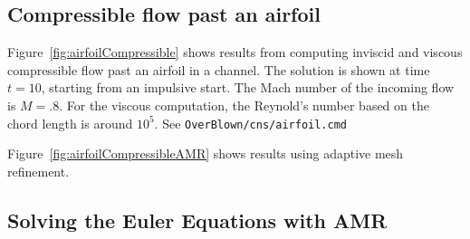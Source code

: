 \documentclass{article}
\newcommand{\obFigures}{\homeHenshaw/res/OverBlown/docFigures}  %
\begin{document}

% 
% 



\clearpage
\subsection{Compressible flow past an airfoil}


Figure~\ref{fig:airfoilCompressible} shows results from computing inviscid and viscous compressible 
flow past an airfoil in a channel. The solution is shown at time $t=10$,  starting
from an impulsive start. The Mach number of the incoming flow is $M=.8$. 
For the viscous computation, the Reynold's number based on the chord length
is around $10^5$. See {\tt OverBlown/\-cns/\-airfoil.cmd}

Figure~\ref{fig:airfoilCompressibleAMR} shows results using adaptive mesh refinement.





\clearpage
\subsection{Solving the Euler Equations with AMR}
\end{document}
